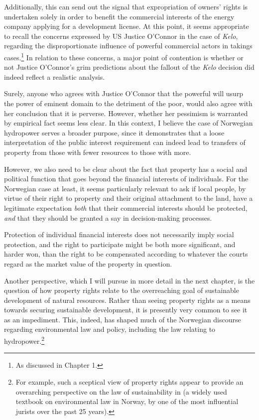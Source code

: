 Additionally, this can send out the signal that expropriation of owners' rights is undertaken solely in order to benefit the commercial interests of the energy company applying for a development license. At this point, it seems appropriate to recall the concerns expressed by US Justice O'Connor in the case of {\it Kelo}, regarding the disproportionate influence of powerful commercial actors in takings cases.\footnote{As discussed in Chapter 1.} In relation to these concerns, a major point of contention is  whether or not Justice O'Connor's grim predictions about the fallout of the {\it Kelo} decision did indeed reflect a realistic analysis. 

Surely, anyone who agrees with Justice O'Connor that the powerful will usurp the power of eminent domain to the detriment of the poor, would also agree with her conclusion that it is perverse. However, whether her pessimism is warranted by empirical fact seems less clear. In this context, I believe the case of Norwegian hydropower serves a broader purpose, since it demonstrates that a loose interpretation of the public interest requirement can  indeed lead to transfers of property from those with fewer resources to those with more.

However, we also need to be clear about the fact that property has a social and political function that goes beyond the financial interests of individuals. For the Norwegian case at least, it seems particularly relevant to ask if local people, by virtue of their right to property and their original attachment to the land, have a legitimate expectation \emph{both} that their commercial interests should be protected, \emph{and} that they should be granted a say in decision-making processes. 

Protection of individual financial interests does not necessarily imply social protection, and the right to participate might be both more significant, and harder won, than the right to be compensated according to whatever the courts regard as the market value of the property in question.

Another perspective, which I will pursue in more detail in the next chapter, is the question of how property rights relate to the overreaching goal of sustainable development of natural resources. Rather than seeing property rights as a means towards securing sustainable development, it is presently very common to see it as an impediment. This, indeed, has shaped much of the Norwegian discourse regarding environmental law and policy, including the law relating to hydropower.\footnote{For example, such a sceptical view of property rights appear to provide an overarching perspective on the law of sustainability in \cite{backer12} (a widely used textbook on environmental law in Norway, by one of the most influential jurists over the past 25 years).}

